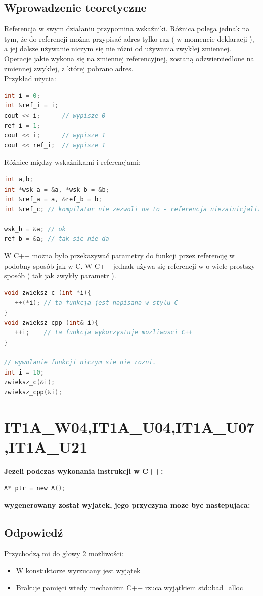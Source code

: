 \subsection{Wprowadzenie teoretyczne}
Referencja w swym działaniu przypomina wskaźniki. Różnica polega jednak na tym, że do referencji można przypisać adres tylko raz ( w momencie deklaracji ), a jej dalsze używanie niczym się nie różni od używania zwykłej zmiennej. Operacje jakie wykona się na zmiennej referencyjnej, zostaną odzwierciedlone na zmiennej zwykłej, z której pobrano adres.\\
Przykład użycia:
\begin{lstlisting}[language=c]
int i = 0;
int &ref_i = i;
cout << i;      // wypisze 0
ref_i = 1;
cout << i;      // wypisze 1
cout << ref_i;  // wypisze 1
\end{lstlisting}
Różnice między wskaźnikami i referencjami:
\begin{lstlisting}[language=c]
int a,b;
int *wsk_a = &a, *wsk_b = &b;
int &ref_a = a, &ref_b = b;
int &ref_c; // kompilator nie zezwoli na to - referencja niezainicjalizowana

wsk_b = &a; // ok
ref_b = &a; // tak sie nie da
\end{lstlisting}
W C++ można było przekazywać parametry do funkcji przez referencję w podobny sposób jak w C. W C++ jednak używa się referencji w o wiele prostszy sposób ( tak jak zwykły parametr ).

\begin{lstlisting}[language=c]
void zwieksz_c (int *i){
   ++(*i); // ta funkcja jest napisana w stylu C
}
void zwieksz_cpp (int& i){
   ++i;    // ta funkcja wykorzystuje mozliwosci C++
}

// wywolanie funkcji niczym sie nie rozni.
int i = 10;
zwieksz_c(&i);
zwieksz_cpp(&i);
\end{lstlisting}

\section{IT1A\_W04,IT1A\_U04,IT1A\_U07,IT1A\_U21} 
\textbf{Jezeli podczas wykonania instrukcji w C++:}
\begin{lstlisting}[language=c]
A* ptr = new A();
\end{lstlisting}
\textbf{wygenerowany został wyjatek, jego przyczyna moze byc nastepujaca:}

\subsection{Odpowiedź}
Przychodzą mi do głowy 2 możliwości:
\begin{itemize}
\item W konstuktorze wyrzucany jest wyjątek
\item Brakuje pamięci wtedy mechanizm C++ rzuca wyjątkiem std::bad\_alloc
\end{itemize}

